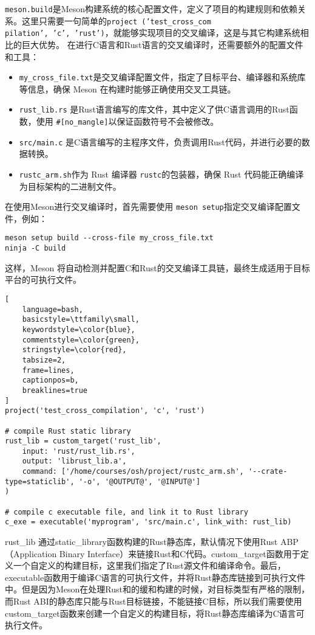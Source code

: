 \indent \texttt{meson.build}是Meson构建系统的核心配置文件，定义了项目的构建规则和依赖关系。这里只需要一句简单的\texttt{project
('test\_cross\_com\\
pilation', 'c', 'rust')}，就能够实现项目的交叉编译，这是与其它构建系统相比的巨大优势。
\indent 在进行C语言和Rust语言的交叉编译时，还需要额外的配置文件和工具：
\begin{itemize}
\item \texttt{my\_cross\_file.txt}是交叉编译配置文件，指定了目标平台、编译器和系统库等信息，确保 Meson 在构建时能够正确使用交叉工具链。
\item \texttt{rust\_lib.rs} 是Rust语言编写的库文件，其中定义了供C语言调用的Rust函数，使用 \texttt{\#[no\_mangle]}以保证函数符号不会被修改。
\item \texttt{src/main.c} 是C语言编写的主程序文件，负责调用Rust代码，并进行必要的数据转换。
\item \texttt{rustc\_arm.sh}作为 Rust 编译器 \texttt{rustc}的包装器，确保 Rust 代码能正确编译为目标架构的二进制文件。
\end{itemize}

\indent 在使用Meson进行交叉编译时，首先需要使用 \texttt{meson setup}指定交叉编译配置文件，例如：
\begin{verbatim}
meson setup build --cross-file my_cross_file.txt
ninja -C build
\end{verbatim}
这样，Meson 将自动检测并配置C和Rust的交叉编译工具链，最终生成适用于目标平台的可执行文件。

\begin{lstlisting}[
    language=bash,
    basicstyle=\ttfamily\small,
    keywordstyle=\color{blue},
    commentstyle=\color{green},
    stringstyle=\color{red},
    tabsize=2,
    frame=lines,
    captionpos=b,
    breaklines=true
]
project('test_cross_compilation', 'c', 'rust')

# compile Rust static library
rust_lib = custom_target('rust_lib',
    input: 'rust/rust_lib.rs',
    output: 'librust_lib.a',
    command: ['/home/courses/osh/project/rustc_arm.sh', '--crate-type=staticlib', '-o', '@OUTPUT@', '@INPUT@']
)

# compile c executable file, and link it to Rust library
c_exe = executable('myprogram', 'src/main.c', link_with: rust_lib)
\end{lstlisting}
\indent rust\_lib 通过static\_library函数构建的Rust静态库，默认情况下使用Rust 
\space ABP（Application Binary Interface）来链接Rust和C代码。custom\_target函数用于定义一个自定义的构建目标，这里我们指定了Rust源文件和编译命令。最后，executable函数用于编译C语言的可执行文件，并将Rust静态库链接到可执行文件中。但是因为Meson在处理Rust和的缓和构建的时候，对目标类型有严格的限制，而Rust \space ABI的静态库只能与Rust目标链接，不能链接C目标，所以我们需要使用custom\_target函数来创建一个自定义的构建目标，将Rust静态库编译为C语言可执行文件。

